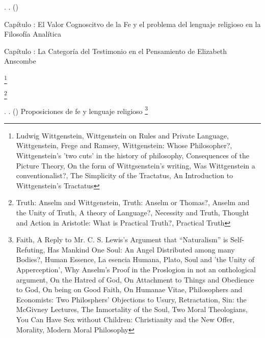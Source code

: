 \documentclass[11pt]{article}
\begin{document}
{\begin{spacing}{1.7}
\tab {}

\tab \tab \tab {}. 
. 
()


{\LARGE Capítulo : 
El Valor Cognoscitvo de la Fe y el problema del lenguaje religioso en la Filosofía Analítica}



{\LARGE Capítulo : 
La Categoría del Testimonio en el Pensamiento de Elizabeth Anscombe}

\footnote{
Ludwig Wittgenstein, 
Wittgenstein on Rules and Private Language, 
Wittgenstein, Frege and Ramsey, 
Wittgenstein: Whose Philosopher?, 
Wittgenstein's 'two cuts' in the history of philosophy, 
Consequences of the Picture Theory, 
On the form of Wittgsenstein's writing, 
Was Wittgenstein a conventionalist?, 
The Simplicity of the Tractatus, 
An Introduction to Wittgenstein's Tractatus
}

\footnote{
Truth: Anselm and Wittgenstein, 
Truth: Anselm or Thomas?, 
Anselm and the Unity of Truth, 
A theory of Language?, 
Necessity and Truth, 
Thought and Action in Aristotle: What is Practical Truth?, 
Practical Truth
}


\tab \tab \tab {}. 
. 
()
Proposiciones de fe y lenguaje religioso
\footnote{
Faith, 
A Reply to Mr. C. S. Lewis's Argument that “Naturalism” is Self- Refuting, 
Has Mankind One Soul: An Angel Distributed among many Bodies?, 
Human Essence, 
La esencia Humana, 
Plato, Soul and 'the Unity of Apperception', 
Why Anselm's Proof in the Proslogion in not an onthological argument, 
On the Hatred of God, 
On Attachment to Things and Obedience to God, 
On being on Good Faith, 
On Humanae Vitae, 
Philosophers and Economists: Two Philosphers' Objections to Usury, 
Retractation, 
Sin: the McGivney Lectures, 
The Inmortality of the Soul, 
Two Moral Theologians, 
You Can Have Sex without Children: Christianity and the New Offer, 
Morality, 
Modern Moral Philosophy
}


\end{spacing}}
\end{document}
